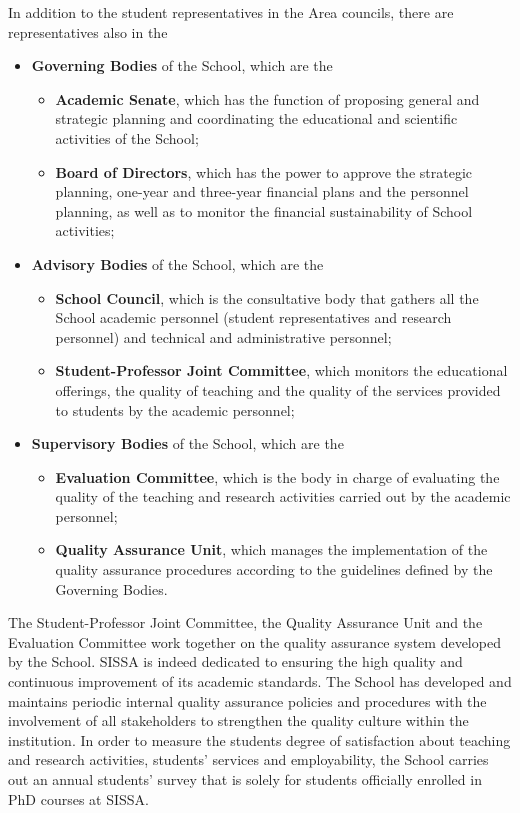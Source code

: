 \documentclass{sissavademecum}
\begin{document}
In addition to the student representatives in the Area councils, there are representatives also in the
\begin{itemize}
	\item \textbf{Governing Bodies} of the School, which are the
	\begin{itemize}
		\item \textbf{Academic Senate}, which has the function of proposing general and strategic planning and coordinating the educational and scientific activities of the School;
		\item \textbf{Board of Directors}, which has the power to approve the strategic planning, one-year and three-year financial plans and the personnel planning, as well as to monitor the financial sustainability of School activities;
	\end{itemize}
	\item \textbf{Advisory Bodies} of the School, which are the
	\begin{itemize}
		\item \textbf{School Council}, which is the consultative body that gathers all the School academic personnel (student representatives and research personnel) and technical and administrative personnel;
		\item \textbf{Student-Professor Joint Committee}, which monitors the educational offerings, the quality of teaching and the quality of the services provided to students by the academic personnel;
	\end{itemize}
	\item \textbf{Supervisory Bodies} of the School, which are the
	\begin{itemize}
		\item \textbf{Evaluation Committee}, which is the body in charge of evaluating the quality of the teaching and research activities carried out by the academic personnel;
		\item \textbf{Quality Assurance Unit}, which manages the implementation of the quality assurance procedures according to the guidelines defined by the Governing Bodies.
	\end{itemize}
\end{itemize}

The Student-Professor Joint Committee, the Quality Assurance Unit and the Evaluation Committee work together on the quality assurance system developed by the School. SISSA is indeed dedicated to ensuring the high quality and continuous improvement of its academic standards. The School has developed and maintains periodic internal quality assurance policies and procedures with the involvement of all stakeholders to strengthen the quality culture within the institution. In order to measure the students degree of satisfaction about teaching and research activities, students' services and employability, the School carries out an annual students' survey that is solely for students officially enrolled in PhD courses at SISSA.
\end{document}
